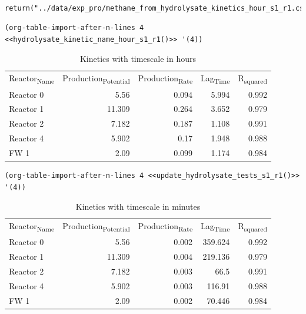 \documentclass[11pt]{article}
\begin{document}
\begin{verbatim}

return("../data/exp_pro/methane_from_hydrolysate_kinetics_hour_s1_r1.csv")
\end{verbatim}

\begin{verbatim}
(org-table-import-after-n-lines 4 <<hydrolysate_kinetic_name_hour_s1_r1()>> '(4))
\end{verbatim}

\begin{table}[htbp]
\caption{Kinetics with timescale in hours}
\centering
\begin{tabular}{lrrrr}
Reactor\textsubscript{Name} & Production\textsubscript{Potential} & Production\textsubscript{Rate} & Lag\textsubscript{Time} & R\textsubscript{squared}\\[0pt]
Reactor 0 & 5.56 & 0.094 & 5.994 & 0.992\\[0pt]
Reactor 1 & 11.309 & 0.264 & 3.652 & 0.979\\[0pt]
Reactor 2 & 7.182 & 0.187 & 1.108 & 0.991\\[0pt]
Reactor 4 & 5.902 & 0.17 & 1.948 & 0.988\\[0pt]
FW 1 & 2.09 & 0.099 & 1.174 & 0.984\\[0pt]
\end{tabular}
\end{table}

\begin{verbatim}
(org-table-import-after-n-lines 4 <<update_hydrolysate_tests_s1_r1()>> '(4))
\end{verbatim}

\begin{table}[htbp]
\caption{Kinetics with timescale in minutes}
\centering
\begin{tabular}{lrrrr}
Reactor\textsubscript{Name} & Production\textsubscript{Potential} & Production\textsubscript{Rate} & Lag\textsubscript{Time} & R\textsubscript{squared}\\[0pt]
Reactor 0 & 5.56 & 0.002 & 359.624 & 0.992\\[0pt]
Reactor 1 & 11.309 & 0.004 & 219.136 & 0.979\\[0pt]
Reactor 2 & 7.182 & 0.003 & 66.5 & 0.991\\[0pt]
Reactor 4 & 5.902 & 0.003 & 116.91 & 0.988\\[0pt]
FW 1 & 2.09 & 0.002 & 70.446 & 0.984\\[0pt]
\end{tabular}
\end{table}
\end{document}
